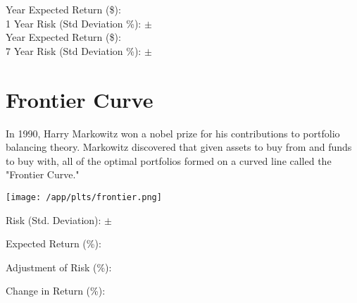 \documentclass{article}
\begin{document}
 Year Expected Return (\$): {} \quad \emph{{}}\\
1 Year Risk (Std Deviation \%): $\pm$ {}
\\
 Year Expected Return (\$): {} \quad \emph{{}}\\
7 Year Risk (Std Deviation \%): $\pm$ {}



\newpage    %



\section{Frontier Curve}

In 1990, Harry Markowitz won a nobel prize for his contributions to portfolio balancing theory. Markowitz discovered that given assets to buy from and funds to buy with, all of the optimal portfolios formed on a curved line called the "Frontier Curve."

\vspace{2cm}

\hspace*{-2.5cm}\texttt{[image: /app/plts/frontier.png]}\par

\vspace{1cm}

Risk (Std. Deviation): $\pm$ {}

Expected Return (\%): {}

Adjustment of Risk (\%): {}

Change in Return (\%): {}


\newpage    %
\end{document}
